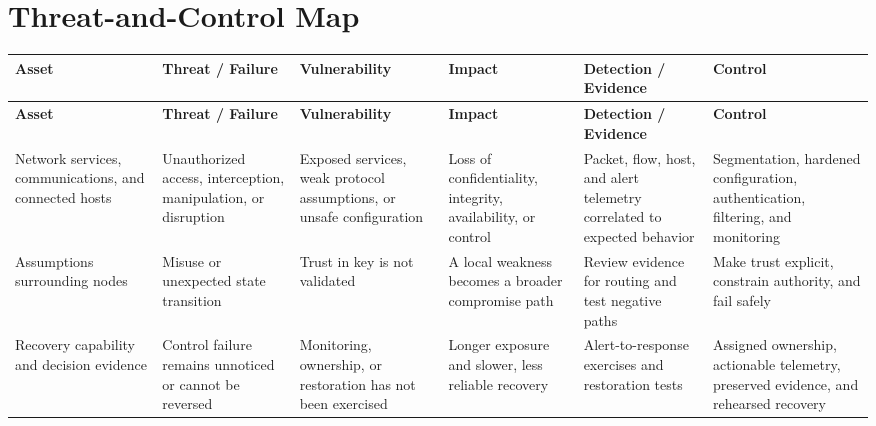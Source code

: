 \documentclass[11pt,letterpaper]{article}
\begin{document}
\section*{Threat-and-Control Map}
\begingroup\scriptsize\setlength{\tabcolsep}{2pt}
\begin{longtable}{>{\raggedright\arraybackslash}p{}>{\raggedright\arraybackslash}p{}>{\raggedright\arraybackslash}p{}>{\raggedright\arraybackslash}p{}>{\raggedright\arraybackslash}p{}>{\raggedright\arraybackslash}p{}}
\toprule\rowcolor{Navy}\color{white}\textbf{Asset} & \color{white}\textbf{Threat / Failure} & \color{white}\textbf{Vulnerability} & \color{white}\textbf{Impact} & \color{white}\textbf{Detection / Evidence} & \color{white}\textbf{Control}\\\midrule
\endfirsthead
\toprule\rowcolor{Navy}\color{white}\textbf{Asset} & \color{white}\textbf{Threat / Failure} & \color{white}\textbf{Vulnerability} & \color{white}\textbf{Impact} & \color{white}\textbf{Detection / Evidence} & \color{white}\textbf{Control}\\\midrule
\endhead
Network services, communications, and connected hosts & Unauthorized access, interception, manipulation, or disruption & Exposed services, weak protocol assumptions, or unsafe configuration & Loss of confidentiality, integrity, availability, or control & Packet, flow, host, and alert telemetry correlated to expected behavior & Segmentation, hardened configuration, authentication, filtering, and monitoring\\\midrule
Assumptions surrounding nodes & Misuse or unexpected state transition & Trust in key is not validated & A local weakness becomes a broader compromise path & Review evidence for routing and test negative paths & Make trust explicit, constrain authority, and fail safely\\\midrule
Recovery capability and decision evidence & Control failure remains unnoticed or cannot be reversed & Monitoring, ownership, or restoration has not been exercised & Longer exposure and slower, less reliable recovery & Alert-to-response exercises and restoration tests & Assigned ownership, actionable telemetry, preserved evidence, and rehearsed recovery\\\midrule
\bottomrule
\end{longtable}
\endgroup
\end{document}

